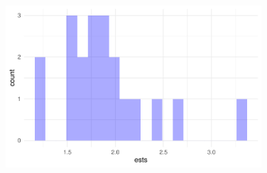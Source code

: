 \documentclass[
  letterpaper,
]{book}
\begin{document}
\begin{figure}[H]

{\centering \includegraphics[width=0.85\textwidth,height=\textheight]{CK_files/figure-pdf/ests-1.pdf}

}

\end{figure}
\end{document}

